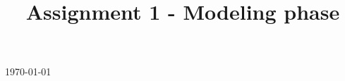 \documentclass[a4paper, 11pt]{article}
\begin{document}
\begin{titlepage}
\vfill

{\large \today} %



\end{titlepage}
\title{Assignment 1 - Modeling phase}
\newpage
\end{document}

